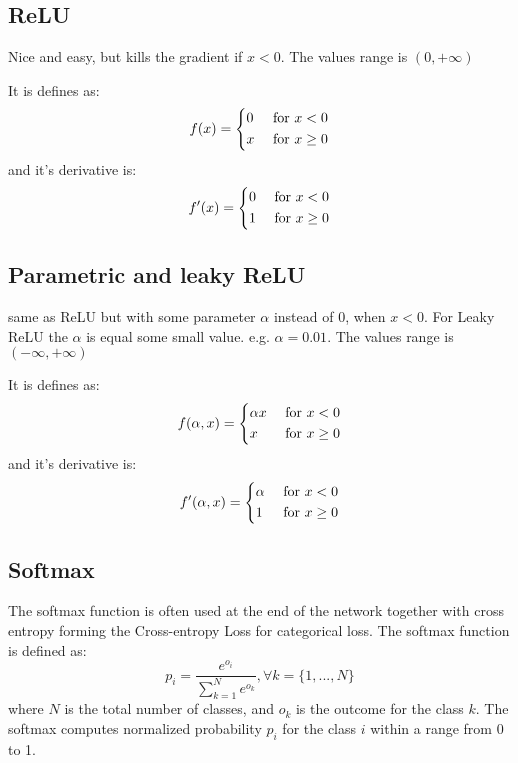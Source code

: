 \documentclass{article}
\begin{document}
\subsection{ReLU}
Nice and easy, but kills the gradient if $x<0$. The values range is $(0,+ \infty)$

It is defines as:
\begin{equation}
     \label{25}
	f(x)= 
	\begin{dcases}
    	0 & \text{ for } x < 0 \\
    	x & \text{ for } x \geq 0
	\end{dcases}
\end{equation}
and it's derivative is:
\begin{equation}
     \label{25}
	f'(x)= 
	\begin{dcases}
    	0 & \text{ for } x < 0 \\
    	1 & \text{ for } x \geq 0
	\end{dcases}
\end{equation}
\subsection{Parametric and leaky ReLU}
same as ReLU but with some parameter $\alpha$ instead of 0, when $x<0$. For Leaky ReLU the $\alpha$ is equal some small value. e.g. $\alpha=0.01$. The values range is $(- \infty,+ \infty)$

It is defines as:
\begin{equation}
     \label{25}
	f(\alpha, x)= 
	\begin{dcases}
    	\alpha x & \text{ for } x < 0 \\
    	x & \text{ for } x \geq 0
	\end{dcases}
\end{equation}
and it's derivative is:
\begin{equation}
     \label{25}
	f'(\alpha, x)= 
	\begin{dcases}
    	\alpha & \text{ for } x < 0 \\
    	1 & \text{ for } x \geq 0
	\end{dcases}
\end{equation}



\subsection{Softmax}
The softmax function is often used at the end of the network together with cross entropy forming the Cross-entropy Loss for categorical loss. The softmax function is defined as:
\begin{equation}
    \label{1}
    p_i = \frac{e^{o_i}}{\sum_{k=1}^{N} e^{o_k}}, \forall k = \{1, ..., N\}
\end{equation}
where $N$ is the total number of classes, and $o_k$ is the outcome for the class $k$. The softmax computes normalized probability $p_i$ for the class $i$ within a range from 0 to 1.
\end{document}

